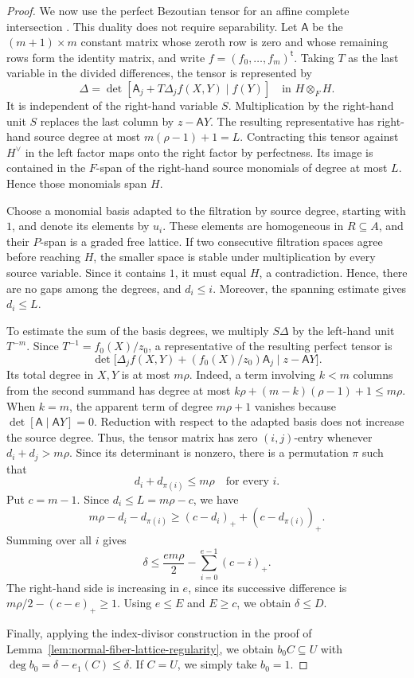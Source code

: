 \documentclass[12pt]{amsart}
\numberwithin{equation}{section}
\theoremstyle{definition}
\theoremstyle{remark}
\numberwithin{equation}{section}
\begin{document}
\begin{proof}
We now use the perfect Bezoutian tensor for an affine complete intersection \cite[Section~4, Theorem~4.7]{JFMR}. This duality does not require separability. Let $\mathsf A$ be the $(m+1)\times m$ constant matrix whose zeroth row is zero and whose remaining rows form the identity matrix, and write $f=(f_0,\ldots,f_m)^{\mathsf t}$. Taking $T$ as the last variable in the divided differences, the tensor is represented by
\[
 \Delta=\det[\mathsf A_j+T\Delta_jf(X,Y)\mid f(Y)]
       \quad\text{in }H\otimes_FH.
\]
It is independent of the right-hand variable $S$. Multiplication by the right-hand unit $S$ replaces the last column by $z-\mathsf A Y$. The resulting representative has right-hand source degree at most $m(\rho-1)+1=L$.  Contracting this tensor against $H^\vee$ in the left factor maps onto the right factor by perfectness. Its image is contained in the $F$-span of the right-hand source monomials of degree at most $L$. Hence those monomials span $H$.

Choose a monomial basis adapted to the filtration by source degree, starting with $1$, and denote its elements by $u_i$. These elements are homogeneous in $R\subseteq A$, and their $P$-span is a graded free lattice. If two consecutive filtration spaces agree before reaching $H$, the smaller space is stable under multiplication by every source variable. Since it contains $1$, it must equal $H$, a contradiction. Hence, there are no gaps among the degrees, and $d_i\le i$. Moreover, the spanning estimate gives $d_i\le L$.

To estimate the sum of the basis degrees, we  multiply $S\Delta$ by the left-hand unit $T^{-m}$. Since $T^{-1}=f_0(X)/z_0$, a representative of the resulting perfect tensor is
\[
 \det\bigl[
  \Delta_j f(X,Y)+(f_0(X)/z_0)\mathsf A_j
       \mid z-\mathsf A Y\bigr].
\]
Its total degree in $X,Y$ is at most $m\rho$. Indeed, a term involving $k<m$ columns from the second summand has degree at most $k\rho+(m-k)(\rho-1)+1\le m\rho$. When $k=m$, the apparent term of degree $m\rho+1$ vanishes because $\det[\mathsf A\mid\mathsf A Y]=0$.
Reduction with respect to the adapted basis does not increase the source degree. Thus, the tensor matrix has zero $(i,j)$-entry whenever $d_i+d_j>m\rho$. Since its determinant is nonzero, there is a permutation $\pi$ such that
\[
 d_i+d_{\pi(i)}\le m\rho\quad\text{for every }i.
\]
Put $c=m-1$. Since $d_i\le L=m\rho-c$, we have
\[
 m\rho-d_i-d_{\pi(i)}
 \ge(c-d_i)_++(c-d_{\pi(i)})_+.
\]
Summing over all $i$ gives
\[
 \delta\le\frac{em\rho}{2}-\sum_{i=0}^{e-1}(c-i)_+.
\]
The right-hand side is increasing in $e$, since its successive difference is $m\rho/2-(c-e)_+\ge1$. Using $e\le E$ and $E\ge c$, we obtain $\delta\le D$.

Finally, applying the index-divisor construction in the proof of Lemma~\ref{lem:normal-fiber-lattice-regularity}, we obtain $b_0C\subseteq U$ with
$\deg b_0=\delta-e_1(C)\le\delta$. If $C=U$, we simply take $b_0=1$.
\end{proof}
\end{document}
